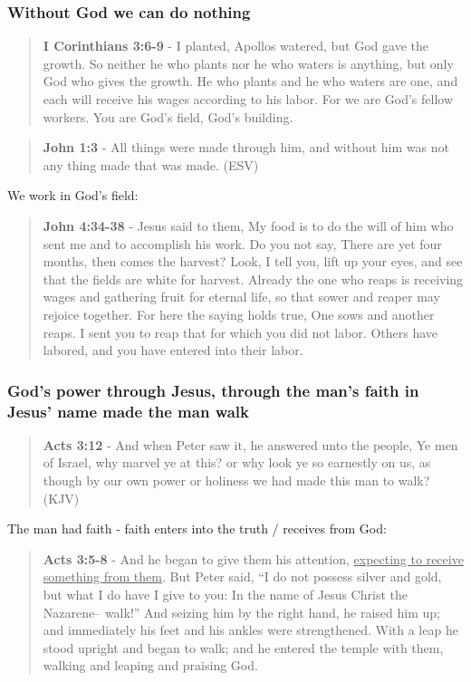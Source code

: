 \documentclass[11pt]{article}
\begin{document}
\subsubsection{Without God we can do nothing}
\label{sec:org466db59}
\begin{quote}
\textbf{I Corinthians 3:6-9} - I planted, Apollos watered, but God gave the growth. So neither he who plants nor he who waters is anything, but only God who gives the growth. He who plants and he who waters are one, and each will receive his wages according to his labor. For we are God's fellow workers. You are God's field, God's building.
\end{quote}

\begin{quote}
\textbf{John 1:3} -  All things were made through him, and without him was not any thing made that was made.  (ESV)
\end{quote}

We work in God's field:

\begin{quote}
\textbf{John 4:34-38} - Jesus said to them, My food is to do the will of him who sent me and to accomplish his work. Do you not say, There are yet four months, then comes the harvest? Look, I tell you, lift up your eyes, and see that the fields are white for harvest. Already the one who reaps is receiving wages and gathering fruit for eternal life, so that sower and reaper may rejoice together. For here the saying holds true, One sows and another reaps. I sent you to reap that for which you did not labor. Others have labored, and you have entered into their labor.
\end{quote}

\subsubsection{God's power through Jesus, through the man's faith in Jesus' name made the man walk}
\label{sec:org1a65e08}
\begin{quote}
\textbf{Acts 3:12} - And when Peter saw it, he answered unto the people, Ye men of Israel, why marvel ye at this? or why look ye so earnestly on us, as though by our own power or holiness we had made this man to walk? (KJV)
\end{quote}

The man had faith - faith enters into the truth / receives from God:

\begin{quote}
\textbf{Acts 3:5-8} - And he began to give them his attention, \uline{expecting to receive something from them}. But Peter said, “I do not possess silver and gold, but what I do have I give to you: In the name of Jesus Christ the Nazarene-- walk!” And seizing him by the right hand, he raised him up; and immediately his feet and his ankles were strengthened. With a leap he stood upright and began to walk; and he entered the temple with them, walking and leaping and praising God.
\end{quote}
\end{document}
